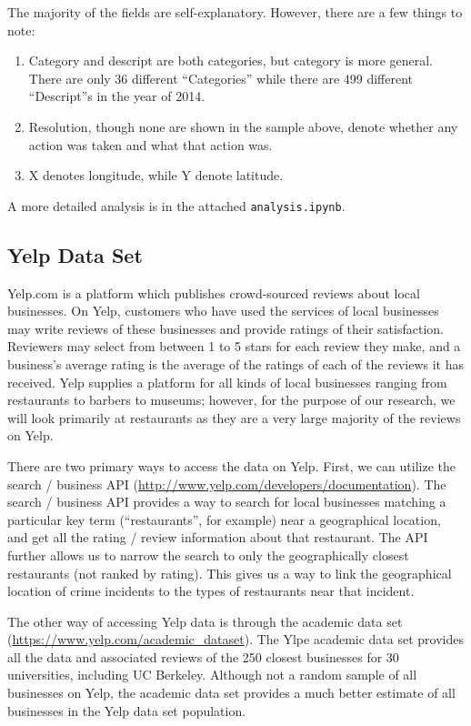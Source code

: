 \documentclass{article}
\begin{document}
The majority of the fields are self-explanatory. However, there are a few
things to note:
\begin{enumerate}
\item Category and descript are both categories, but category is more
  general. There are only 36 different ``Categories'' while there are 499
  different ``Descript''s in the year of 2014.
\item Resolution, though none are shown in the sample above, denote whether
  any action was taken and what that action was.
\item X denotes longitude, while Y denote latitude.
\end{enumerate}

A more detailed analysis is in the attached \texttt{analysis.ipynb}.

\subsection{Yelp Data Set}

Yelp.com is a platform which publishes crowd-sourced reviews about local
businesses. On Yelp, customers who have used the services of local
businesses may write reviews of these businesses and provide ratings of
their satisfaction. Reviewers may select from between 1 to 5 stars for each
review they make, and a business's average rating is the average of the
ratings of each of the reviews it has received. Yelp supplies a platform
for all kinds of local businesses ranging from restaurants to barbers to
museums; however, for the purpose of our research, we will look primarily
at restaurants as they are a very large majority of the reviews on Yelp.

There are two primary ways to access the data on Yelp. First, we can
utilize the search / business API
(\url{http://www.yelp.com/developers/documentation}). The search / business
API provides a way to search for local businesses matching a particular key
term (``restaurants'', for example) near a geographical location, and get
all the rating / review information about that restaurant. The API further
allows us to narrow the search to only the geographically closest
restaurants (not ranked by rating). This gives us a way to link the
geographical location of crime incidents to the types of restaurants near
that incident.

The other way of accessing Yelp data is through the academic data set
(\url{https://www.yelp.com/academic_dataset}). The Ylpe academic data set
provides all the data and associated reviews of the 250 closest businesses
for 30 universities, including UC Berkeley. Although not a random sample of
all businesses on Yelp, the academic data set provides a much better
estimate of all businesses in the Yelp data set population.
\end{document}
